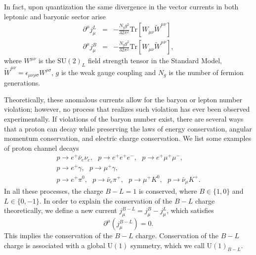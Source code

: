 In fact, upon quantization the same divergence in the vector currents in both leptonic and baryonic sector arise
\begin{eqnarray}
	\partial^{\mu}j_{\mu}^L & = &-\frac{N_g g^2}{32\pi^2}\text{Tr}[W_{\mu\nu}\tilde W^{\mu\nu}]\nonumber\\
		\partial^{\mu}j_{\mu}^{B} & = & -\frac{N_g g^2}{32\pi^2}\text{Tr}[W_{\mu\nu}\tilde W^{\mu\nu}],
\end{eqnarray}
where $W^{\mu\nu}$ is the $\text{SU}(2)_L$ field strength tensor in the Standard Model, $\tilde W^{\mu\nu} = \epsilon_{\mu\nu\rho\sigma}W^{\rho\sigma}$, $g$ is the weak gauge coupling and $N_g$ is the number of fermion generations.

Theoretically, these anomalous currents allow for the baryon or lepton number violation; however, no process that realizes such violation has ever been observed experimentally. If violations of the baryon number exist, there are several ways that a proton can decay while preserving the laws of energy conservation, angular momentum conservation, and electric charge con\-ser\-va\-tion. We list some examples of proton channel decays \cite{Primakoff1981}
\begin{gather} 
 p \to e^+ \bar{\nu}_e{\nu}_e, \ \ \ p \to  e^+e^+  e^- ,\ \ \ p \to  e^+\mu^+  \mu^-,\nonumber \\
 p \to e^+ \gamma,\ \ \ p \to \mu^+\gamma, \nonumber\\
 p  \to  e^+ \pi^0,\ \ \ p  \to  \bar{\nu}_e\pi^+, \ \ \ p  \to  \mu^+ K^0, \ \ \ p  \to  \bar{\nu}_{\mu}K^+.
\end{gather}
In all these processes, the charge $B-L=1$ is conserved, where $B\in\{1,0\}$ and $L\in\{0,-1\}$. In order to explain the conservation of the $B-L$ charge theoretically, we define a new current $j_{\mu}^{B-L}=j_{\mu}^B-j_{\mu}^L$, which satisfies
\begin{equation}
	\partial^{\mu}(j_{\mu}^{B-L}) = 0.
\end{equation}
This implies the conservation of the $B-L$ charge.
Conservation of the $B-L$ charge is associated with a global U$(1)$ symmetry, which we call U$(1)_{B-L}$.%